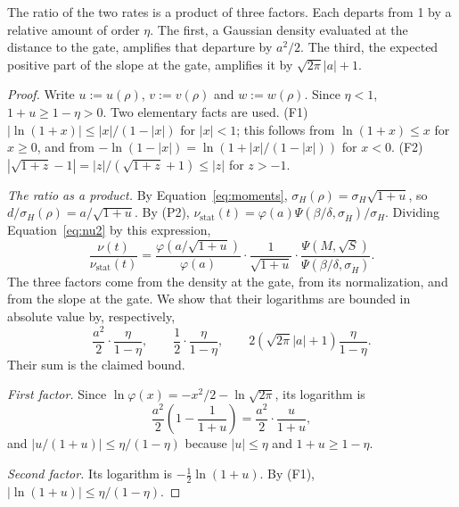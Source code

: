 \documentclass[a4paper,11pt]{article}
\theoremstyle{definition}
\newcommand{\nustat}{{\nu }_{\mathrm{stat}}}
\newcommand{\1}{\mathbbm{1}}
\begin{document}
The ratio of the two rates is a product of three factors. Each departs from 1 by a relative amount of order $\eta$. The first, a Gaussian density evaluated at the distance to the gate, amplifies that departure by $a^{2}/2$. The third, the expected positive part of the slope at the gate, amplifies it by $\sqrt{2\pi}|a|+1$.

\begin{proof}
Write $u:=u(\rho)$, $v:=v(\rho)$ and $w:=w(\rho)$. Since $\eta<1$, $1+u\ge 1-\eta>0$. Two elementary facts are used. (F1) $|\ln(1+x)|\le|x|/(1-|x|)$ for $|x|<1$; this follows from $\ln(1+x)\le x$ for $x\ge 0$, and from $-\ln(1-|x|)=\ln\left(1+|x|/(1-|x|)\right)$ for $x<0$. (F2) $|\sqrt{1+z}-1|=|z|/(\sqrt{1+z}+1)\le|z|$ for $z>-1$.

\emph{The ratio as a product.} By Equation~\eqref{eq:moments}, $\sigma_{H}(\rho)=\sigma_{H}\sqrt{1+u}$, so $d/\sigma_{H}(\rho)=a/\sqrt{1+u}$. By (P2), $\nustat(t)=\varphi(a)\Psi\left(\beta/\delta,\sigma_{\dot{H}}\right)/\sigma_{H}$. Dividing Equation~\eqref{eq:nu2} by this expression,
\begin{equation*}
\frac{\nu(t)}{\nustat(t)}=\frac{\varphi\left(a/\sqrt{1+u}\right)}{\varphi(a)}\cdot\frac{1}{\sqrt{1+u}}\cdot\frac{\Psi\left(M,\sqrt{S}\right)}{\Psi\left(\beta/\delta,\sigma_{\dot{H}}\right)}.
\end{equation*}
The three factors come from the density at the gate, from its normalization, and from the slope at the gate. We show that their logarithms are bounded in absolute value by, respectively,
\begin{equation*}
\frac{a^{2}}{2}\cdot\frac{\eta}{1-\eta}, \qquad \frac{1}{2}\cdot\frac{\eta}{1-\eta}, \qquad 2\left(\sqrt{2\pi}|a|+1\right)\frac{\eta}{1-\eta}.
\end{equation*}
Their sum is the claimed bound.

\emph{First factor.} Since $\ln\varphi(x)=-x^{2}/2-\ln\sqrt{2\pi}$, its logarithm is
\begin{equation*}
\frac{a^{2}}{2}\left(1-\frac{1}{1+u}\right)=\frac{a^{2}}{2}\cdot\frac{u}{1+u},
\end{equation*}
and $|u/(1+u)|\le\eta/(1-\eta)$ because $|u|\le\eta$ and $1+u\ge 1-\eta$.

\emph{Second factor.} Its logarithm is $-\tfrac{1}{2}\ln(1+u)$. By (F1), $|\ln(1+u)|\le\eta/(1-\eta)$.


\end{proof}
\end{document}
